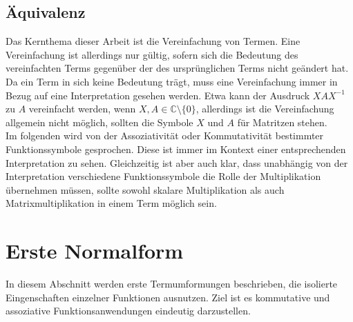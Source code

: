 \documentclass{article}
\begin{document}
\subsection{Äquivalenz}
Das Kernthema dieser Arbeit ist die Vereinfachung von Termen. Eine Vereinfachung ist allerdings nur gültig, sofern sich die Bedeutung des vereinfachten Terms gegenüber der des ursprünglichen Terms nicht geändert hat. Da ein Term in sich keine Bedeutung trägt, muss eine Vereinfachung immer in Bezug auf eine Interpretation gesehen werden. Etwa kann der Ausdruck $X A X^{-1}$ zu $A$ vereinfacht werden, wenn $X, A \in \mathbb{C} \setminus \{0\}$, allerdings ist die Vereinfachung allgemein nicht möglich, sollten die Symbole $X$ und $A$ für Matritzen stehen. \\
Im folgenden wird von der Assoziativität oder Kommutativität bestimmter Funktionssymbole gesprochen. Diese ist immer im Kontext einer entsprechenden Interpretation zu sehen. Gleichzeitig ist aber auch klar, dass unabhängig von der Interpretation verschiedene Funktionssymbole die Rolle der Multiplikation übernehmen müssen, sollte sowohl skalare Multiplikation als auch Matrixmultiplikation in einem Term möglich sein. 

\section {Erste Normalform}
In diesem Abschnitt werden erste Termumformungen beschrieben, die isolierte Eingenschaften einzelner Funktionen ausnutzen. Ziel ist es kommutative und assoziative Funktionsanwendungen eindeutig darzustellen.\\
\end{document}
